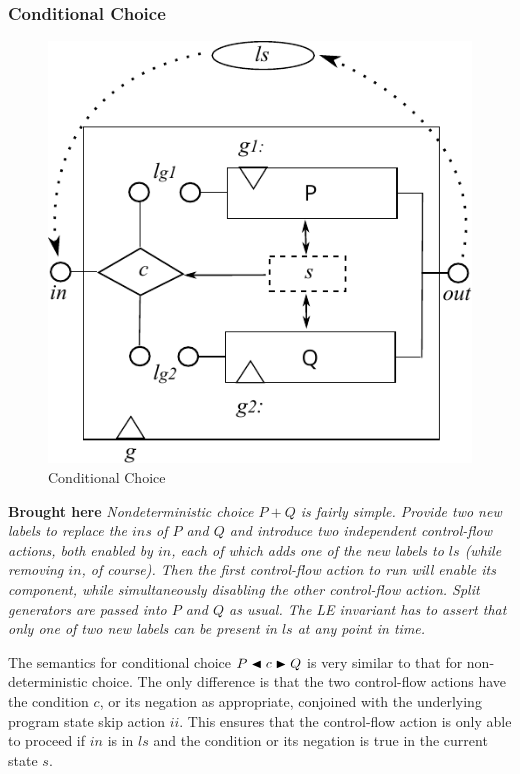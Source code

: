 \newpage
\subsubsection{Conditional Choice}

\begin{figure}
  \centering
  \includegraphics{images/conditional-actual}
  \caption{Conditional Choice}
  \label{fig:conditional}
\end{figure}


\textbf{Brought here}
\emph{Nondeterministic choice $P+Q$ is fairly simple.
Provide two new labels to replace the $in$s of $P$ and $Q$
and introduce two independent control-flow actions,
both enabled by $in$, each of which adds one of the new labels to $ls$
(while removing $in$, of course).
Then the first control-flow action to run will enable its component,
while simultaneously disabling the other control-flow action.
Split generators are passed into $P$ and $Q$ as usual.
The LE invariant has to assert that only one of two new labels
can be present in $ls$ at any point in time.
}

The semantics for conditional choice $P \mathrel{\blacktriangleleft{c}\blacktriangleright} Q$
is very similar to that for non-deterministic choice.
The only difference is that the two control-flow actions
have the condition $c$, or its negation as appropriate,
conjoined with the underlying program state skip action $ii$.
This ensures that the control-flow action is only able to proceed
if $in$ is in $ls$ and the condition or its negation is true
in the current state $s$.



